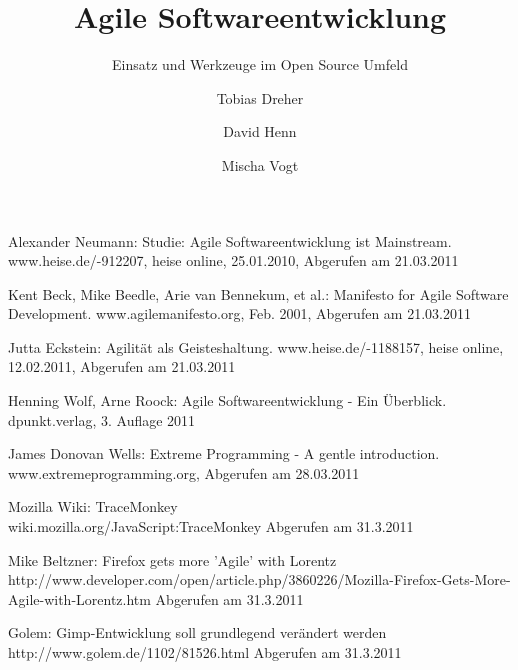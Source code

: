 \documentclass[german,english]{header}
\begin{document}

\title{Agile Softwareentwicklung}
\subtitle{Einsatz und Werkzeuge im Open Source Umfeld}
\author{Tobias Dreher\and David Henn\and Mischa Vogt}

\maketitle







\begin{thebibliography}{5}
Alexander Neumann:
Studie: Agile Softwareentwicklung ist Mainstream.
www.heise.de/-912207, heise online, 25.01.2010, Abgerufen am 21.03.2011

Kent Beck, Mike Beedle, Arie van Bennekum, et al.: 
Manifesto for Agile Software Development.
www.agilemanifesto.org, Feb. 2001, Abgerufen am 21.03.2011

Jutta Eckstein: 
Agilität als Geisteshaltung.
www.heise.de/-1188157, heise online, 12.02.2011, Abgerufen am 21.03.2011

Henning Wolf, Arne Roock: 
Agile Softwareentwicklung - Ein Überblick.
dpunkt.verlag, 3. Auflage 2011

James Donovan Wells: 
Extreme Programming - A gentle introduction.
www.extremeprogramming.org, Abgerufen am 28.03.2011

Mozilla Wiki:
TraceMonkey
\\wiki.mozilla.org/JavaScript:TraceMonkey Abgerufen am 31.3.2011

Mike Beltzner:
Firefox gets more 'Agile' with Lorentz
\\http://www.developer.com/open/article.php/3860226/Mozilla-Firefox-Gets-More-Agile-with-Lorentz.htm Abgerufen am 31.3.2011

Golem: Gimp-Entwicklung soll grundlegend verändert werden
http://www.golem.de/1102/81526.html Abgerufen am 31.3.2011

\end{thebibliography}
\end{document}

